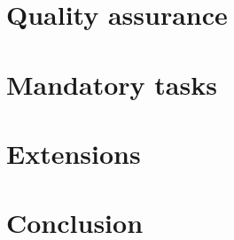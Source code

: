 


	
	\frontmatter
		
	\newpage	
	\tableofcontents 
	
	
	\mainmatter
	
	\chapter{Quality assurance}
	
	 
	
	\chapter{Mandatory tasks}
	
	
	
	
	
	\chapter{Extensions}
	
	
	
	\chapter{Conclusion}
	
	
	\backmatter
	

